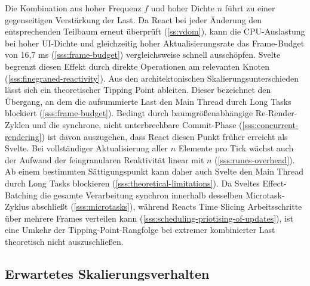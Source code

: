 Die Kombination aus hoher Frequenz $f$ und hoher Dichte $n$ führt zu einer gegenseitigen Verstärkung der Last. Da React bei jeder Änderung den entsprechenden Teilbaum erneut überprüft (\cref{ss:vdom}), kann die CPU-Auslastung bei hoher UI-Dichte und gleichzeitig hoher Aktualisierungsrate das Frame-Budget von 16,7 ms (\cref{sss:frame-budget}) vergleichsweise schnell ausschöpfen. Svelte begrenzt diesen Effekt durch direkte Operationen am relevanten Knoten (\cref{sss:finegraned-reactivity}). Aus den architektonischen Skalierungsunterschieden lässt sich ein theoretischer Tipping Point ableiten. Dieser bezeichnet den Übergang, an dem die aufsummierte Last den Main Thread durch Long Tasks blockiert (\cref{sss:frame-budget}). Bedingt durch baumgrößenabhängige Re-Render-Zyklen und die synchrone, nicht unterbrechbare Commit-Phase (\cref{sss:concurrent-rendering}) ist davon auszugehen, dass React diesen Punkt früher erreicht als Svelte. Bei vollständiger Aktualisierung aller $n$ Elemente pro Tick wächst auch der Aufwand der feingranularen Reaktivität linear mit $n$ (\cref{sss:runes-overhead}). Ab einem bestimmten Sättigungspunkt kann daher auch Svelte den Main Thread durch Long Tasks blockieren (\cref{sss:theoretical-limitations}). Da Sveltes Effect-Batching die gesamte Verarbeitung synchron innerhalb desselben Microtask-Zyklus abschließt (\cref{sss:microtasks}), während Reacts Time Slicing Arbeitsschritte über mehrere Frames verteilen kann (\cref{sss:scheduling-priotising-of-updates}), ist eine Umkehr der Tipping-Point-Rangfolge bei extremer kombinierter Last theoretisch nicht auszuschließen.


\subsection{Erwartetes Skalierungsverhalten}
\label{ss:expected-scaling}

